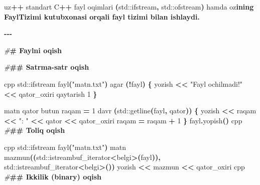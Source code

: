 \documentclass[a4paper,11pt,twoside,openright]{book}
\newenvironment{Shaded}{\begin{snugshade}}{\end{snugshade}}
\newcommand{\BuiltInTok}[1]{#1}
\newcommand{\CharTok}[1]{\textcolor[rgb]{0.31,0.60,0.02}{#1}}
\newcommand{\DecValTok}[1]{\textcolor[rgb]{0.00,0.00,0.81}{#1}}
\newcommand{\ErrorTok}[1]{\textcolor[rgb]{0.64,0.00,0.00}{\textbf{#1}}}
\newcommand{\NormalTok}[1]{#1}
\newcommand{\OperatorTok}[1]{\textcolor[rgb]{0.81,0.36,0.00}{\textbf{#1}}}
\newcommand{\PreprocessorTok}[1]{\textcolor[rgb]{0.56,0.35,0.01}{\textit{#1}}}
\newcommand{\StringTok}[1]{\textcolor[rgb]{0.31,0.60,0.02}{#1}}
\begin{document}
\begin{Shaded}
\begin{Highlighting}[]
\NormalTok{uz}\OperatorTok{++}\NormalTok{ standart C}\OperatorTok{++}\NormalTok{ fayl oqimlari }\OperatorTok{(}\ErrorTok{\textasciigrave{}}\BuiltInTok{std::}\NormalTok{ifstream}\ErrorTok{\textasciigrave{}}\OperatorTok{,} \ErrorTok{\textasciigrave{}}\BuiltInTok{std::}\NormalTok{ofstream}\ErrorTok{\textasciigrave{}}\OperatorTok{)}\NormalTok{ hamda o}\CharTok{\textquotesingle{}z}\ErrorTok{ining \textasciigrave{}FaylTizimi\textasciigrave{} kutubxonasi orqali fayl tizimi bilan ishlaydi.}

\OperatorTok{{-}{-}{-}}

\PreprocessorTok{\#}\ErrorTok{\# Faylni o\textquotesingle{}qish}

\PreprocessorTok{\#}\ErrorTok{\#\# Satrma{-}satr o\textquotesingle{}qish}

\ErrorTok{\textasciigrave{}\textasciigrave{}\textasciigrave{}}\NormalTok{cpp}
\BuiltInTok{std::}\NormalTok{ifstream fayl}\OperatorTok{(}\StringTok{"matn.txt"}\OperatorTok{)}
\NormalTok{agar }\OperatorTok{(!}\NormalTok{fayl}\OperatorTok{)} \OperatorTok{\{}
\NormalTok{    yozish }\OperatorTok{\textless{}\textless{}} \StringTok{"Fayl ochilmadi!"} \OperatorTok{\textless{}\textless{}}\NormalTok{ qator\_oxiri}
\NormalTok{    qaytarish }\DecValTok{1}
\OperatorTok{\}}

\NormalTok{matn qator}
\NormalTok{butun raqam }\OperatorTok{=} \DecValTok{1}
\NormalTok{davr }\OperatorTok{(}\BuiltInTok{std::}\NormalTok{getline}\OperatorTok{(}\NormalTok{fayl}\OperatorTok{,}\NormalTok{ qator}\OperatorTok{))} \OperatorTok{\{}
\NormalTok{    yozish }\OperatorTok{\textless{}\textless{}}\NormalTok{ raqam }\OperatorTok{\textless{}\textless{}} \StringTok{": "} \OperatorTok{\textless{}\textless{}}\NormalTok{ qator }\OperatorTok{\textless{}\textless{}}\NormalTok{ qator\_oxiri}
\NormalTok{    raqam }\OperatorTok{=}\NormalTok{ raqam }\OperatorTok{+} \DecValTok{1}
\OperatorTok{\}}
\NormalTok{fayl}\OperatorTok{.}\NormalTok{yopish}\OperatorTok{()}
\ErrorTok{\textasciigrave{}\textasciigrave{}\textasciigrave{}}\NormalTok{cpp}
\PreprocessorTok{\#}\ErrorTok{\#\# To\textquotesingle{}liq o\textquotesingle{}qish}

\ErrorTok{\textasciigrave{}\textasciigrave{}\textasciigrave{}}\NormalTok{cpp}
\BuiltInTok{std::}\NormalTok{ifstream fayl}\OperatorTok{(}\StringTok{"matn.txt"}\OperatorTok{)}
\NormalTok{matn mazmun}\OperatorTok{((}\BuiltInTok{std::}\NormalTok{istreambuf\_iterator}\OperatorTok{\textless{}}\NormalTok{belgi}\OperatorTok{\textgreater{}(}\NormalTok{fayl}\OperatorTok{)),}
             \BuiltInTok{std::}\NormalTok{istreambuf\_iterator}\OperatorTok{\textless{}}\NormalTok{belgi}\OperatorTok{\textgreater{}())}
\NormalTok{yozish }\OperatorTok{\textless{}\textless{}}\NormalTok{ mazmun }\OperatorTok{\textless{}\textless{}}\NormalTok{ qator\_oxiri}
\ErrorTok{\textasciigrave{}\textasciigrave{}\textasciigrave{}}\NormalTok{cpp}
\PreprocessorTok{\#}\ErrorTok{\#\# Ikkilik (binary) o\textquotesingle{}qish}


\end{Highlighting}
\end{Shaded}
\end{document}
